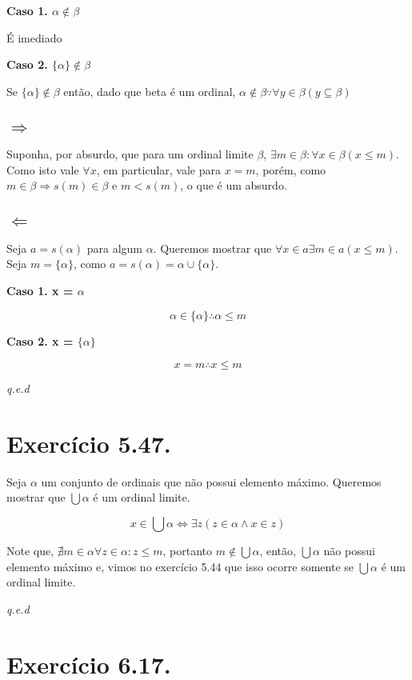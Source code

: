 \documentclass[12pt]{extarticle}
\newcommand{\fim}{\begin{flushright}

   \emph{q.e.d}
\end{flushright}}
\begin{document}
\textbf{Caso 1. $\alpha \notin \beta$}

É imediado

\textbf{Caso 2. $\{\alpha\} \notin \beta$}

Se $\{\alpha\} \notin \beta$ então, dado que beta é um ordinal, $\alpha \notin \beta \because \forall y \in \beta (y \subseteq \beta)$ 


\subsection{$\Rightarrow$}

Suponha, por absurdo, que para um ordinal limite $\beta$, $\exists m \in \beta : \forall x \in \beta (x \leq m)$. Como isto vale $\forall x$, em particular, vale para $x = m$, porém, como $m \in \beta \Rightarrow s(m) \in \beta$ e $m < s(m)$, o que é um absurdo. 

\subsection{$\Leftarrow$}

Seja $a = s(\alpha)$ para algum $\alpha$. Queremos mostrar que $\forall x \in a \exists m \in a (x \leq m)$. Seja $m = \{\alpha\}$, como $a = s(\alpha) = \alpha \cup \{\alpha\}$. 

\textbf{Caso 1. x = $\alpha$}

$$\alpha \in \{\alpha\} \therefore \alpha \leq m$$

\textbf{Caso 2. x = $\{\alpha\}$}

$$
x = m \therefore x \leq m
$$

\fim

\section{Exercício 5.47.}

Seja $\alpha$ um conjunto de ordinais que não possui elemento máximo. Queremos mostrar que $\bigcup \alpha$ é um ordinal limite.

$$
x \in \bigcup \alpha \Leftrightarrow \exists z (z \in \alpha \land x \in z)
$$

Note que, $\nexists m \in \alpha \forall z \in \alpha   : z \leq m$, portanto $m \notin \bigcup \alpha$, então, $\bigcup \alpha$ não possui elemento máximo e, vimos no exercício 5.44 que isso ocorre somente se $\bigcup \alpha$ é um ordinal limite.  

\fim

\section{Exercício 6.17.}
\end{document}
